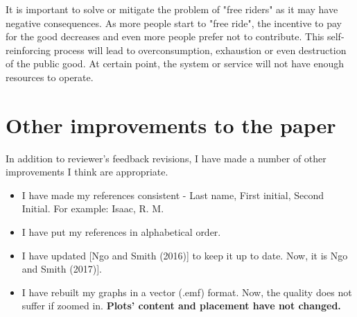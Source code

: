 \documentclass{article}
\newenvironment{itpars}
	{\par\itshape}
	{\par}
\begin{document}
\begin{enumerate}
				\begin{itpars}

					It is important to solve or mitigate the problem of "free riders" as it may have negative consequences. As more people start to "free ride", the incentive to pay for the good decreases and even more people prefer not to contribute. This self-reinforcing process will lead to overconsumption, exhaustion or even destruction of the public good. At certain point, the system or service will not have enough resources to operate.

				\end{itpars}

		\end{enumerate}

	\clearpage

		\section*{Other improvements to the paper}

			In addition to reviewer's feedback revisions, I have made a number of other improvements I think are appropriate.

			\begin{itemize}
				\item 

					I have made my references consistent - Last name, First initial, Second Initial. For example: Isaac, R. M.

				\item

					I have put my references in alphabetical order.

				\item

					I have updated [Ngo and Smith (2016)] to keep it up to date. Now, it is Ngo and Smith (2017)].

				\item

					I have rebuilt my graphs in a vector (.emf) format. Now, the quality does not suffer if zoomed in. \textbf{Plots' content and placement have not changed.}					

			\end{itemize}
\end{document}
